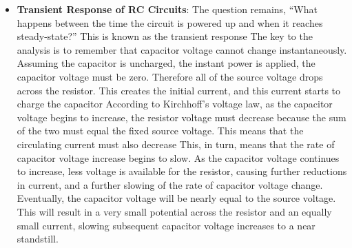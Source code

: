 \documentclass{report}
\begin{document}
\begin{itemize}
            \begin{align*}
                C = \frac{Q}{V}
            ,\end{align*}
            with
            \begin{align*}
                Q = It
            .\end{align*}
            Thus,
            \begin{align*}
                C = \frac{It}{V}
            .\end{align*}
            Now, with $V = IR$, 
            \begin{align*}
                \frac{1}{I} = \frac{R}{V}
            .\end{align*}
            Thus,
            \begin{align*}
                \tau = RC = \frac{R}{V}It = \frac{1}{I}It = t
            .\end{align*}
            So, $\tau$ is indeed a measure of time.
        \item \textbf{Transient Response of RC Circuits}: The question remains, “What happens between the time the circuit is powered up and when it reaches steady-state?” This is known as the transient response
            \bigbreak \noindent 
            \bigbreak \noindent 
            The key to the analysis is to remember that capacitor voltage cannot change instantaneously. Assuming the capacitor is uncharged, the instant power is applied, the capacitor voltage must be zero. Therefore all of the source voltage drops across the resistor. This creates the initial current, and this current starts to charge the capacitor
            \bigbreak \noindent 
            According to Kirchhoff's voltage law, as the capacitor voltage begins to increase, the resistor voltage must decrease because the sum of the two must equal the fixed source voltage. This means that the circulating current must also decrease
            \bigbreak \noindent 
            This, in turn, means that the rate of capacitor voltage increase begins to slow. As the capacitor voltage continues to increase, less voltage is available for the resistor, causing further reductions in current, and a further slowing of the rate of capacitor voltage change. Eventually, the capacitor voltage will be nearly equal to the source voltage.
            \bigbreak \noindent 
            This will result in a very small potential across the resistor and an equally small current, slowing subsequent capacitor voltage increases to a near standstill.
            \bigbreak \noindent 

\end{itemize}
\end{document}
